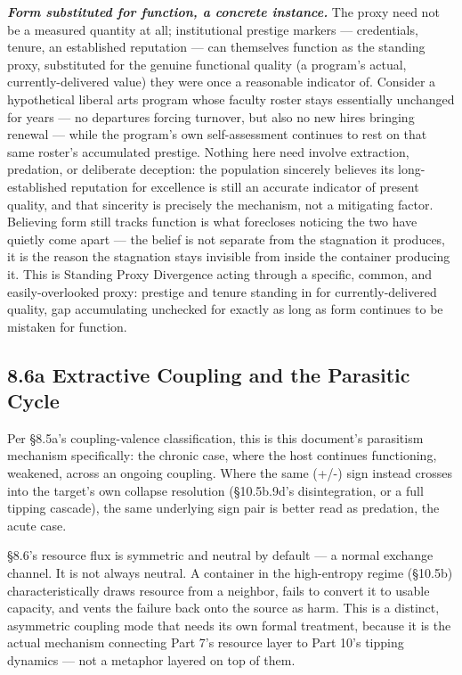 \documentclass[
]{article}
\begin{document}
\emph{\textbf{Form substituted for function, a concrete instance.}} The
proxy need not be a measured quantity at all; institutional prestige
markers --- credentials, tenure, an established reputation --- can
themselves function as the standing proxy, substituted for the genuine
functional quality (a program's actual, currently-delivered value) they
were once a reasonable indicator of. Consider a hypothetical liberal
arts program whose faculty roster stays essentially unchanged for years
--- no departures forcing turnover, but also no new hires bringing
renewal --- while the program's own self-assessment continues to rest on
that same roster's accumulated prestige. Nothing here need involve
extraction, predation, or deliberate deception: the population sincerely
believes its long-established reputation for excellence is still an
accurate indicator of present quality, and that sincerity is precisely
the mechanism, not a mitigating factor. Believing form still tracks
function is what forecloses noticing the two have quietly come apart ---
the belief is not separate from the stagnation it produces, it is the
reason the stagnation stays invisible from inside the container
producing it. This is Standing Proxy Divergence acting through a
specific, common, and easily-overlooked proxy: prestige and tenure
standing in for currently-delivered quality, gap accumulating unchecked
for exactly as long as form continues to be mistaken for function.

\hypertarget{a-extractive-coupling-and-the-parasitic-cycle}{%
\subsection{8.6a Extractive Coupling and the Parasitic
Cycle}\label{a-extractive-coupling-and-the-parasitic-cycle}}

Per §8.5a's coupling-valence classification, this is this document's
parasitism mechanism specifically: the chronic case, where the host
continues functioning, weakened, across an ongoing coupling. Where the
same (+/-) sign instead crosses into the target's own collapse
resolution (§10.5b.9d's disintegration, or a full tipping cascade), the
same underlying sign pair is better read as predation, the acute case.

§8.6's resource flux is symmetric and neutral by default --- a normal
exchange channel. It is not always neutral. A container in the
high-entropy regime (§10.5b) characteristically draws resource from a
neighbor, fails to convert it to usable capacity, and vents the failure
back onto the source as harm. This is a distinct, asymmetric coupling
mode that needs its own formal treatment, because it is the actual
mechanism connecting Part 7's resource layer to Part 10's tipping
dynamics --- not a metaphor layered on top of them.
\end{document}
